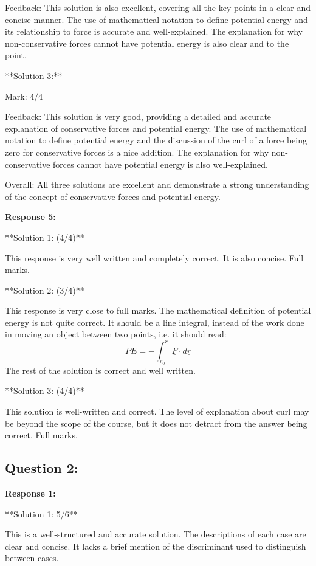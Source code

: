 \documentclass[a4paper,11pt]{article}
\begin{document}
Feedback: This solution is also excellent, covering all the key points in a clear and concise manner. The use of mathematical notation to define potential energy and its relationship to force is accurate and well-explained. The explanation for why non-conservative forces cannot have potential energy is also clear and to the point.

**Solution 3:**

Mark: 4/4

Feedback: This solution is very good, providing a detailed and accurate explanation of conservative forces and potential energy. The use of mathematical notation to define potential energy and the discussion of the curl of a force being zero for conservative forces is a nice addition. The explanation for why non-conservative forces cannot have potential energy is also well-explained.

Overall: All three solutions are excellent and demonstrate a strong understanding of the concept of conservative forces and potential energy.

\bigskip    
\textbf{Response 5:}

**Solution 1: (4/4)**

This response is very well written and completely correct. It is also concise. Full marks.

**Solution 2: (3/4)**

This response is very close to full marks. The mathematical definition of potential energy is not quite correct. It should be a line integral, instead of the work done in moving an object between two points, i.e. it should read:
\[ PE = -\int_{r_0}^r \underline{F} \cdot d\underline{r} \]
The rest of the solution is correct and well written. 

**Solution 3: (4/4)**

This solution is well-written and correct. The level of explanation about curl may be beyond the scope of the course, but it does not detract from the answer being correct. Full marks. 

\subsection*{Question 2:}

\textbf{Response 1:}

**Solution 1: 5/6**

This is a well-structured and accurate solution. The descriptions of each case are clear and concise. It lacks a brief mention of the discriminant used to distinguish between cases.
\end{document}
